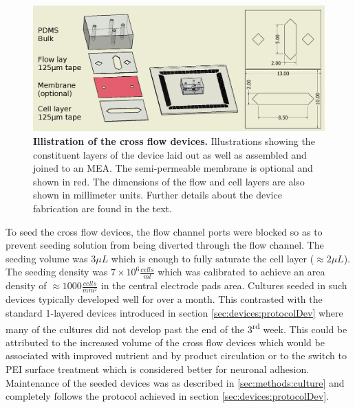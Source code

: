  \begin{figure}[h]
       \centering
       \includegraphics[width=15cm]{chapter5/figures/crossFlowIllustration/crossFlowIllustration.jpg}
       \caption[Illustration of the cross flow devices used for measuring culture activity under flow]{\textbf{Illistration of the cross flow devices.} Illustrations showing the constituent layers of the device laid out as well as assembled and joined to an MEA. The semi-permeable membrane is optional and shown in red. The dimensions of the flow and cell layers are also shown in millimeter units. Further details about the device fabrication are found in the text.}
       \label{fig:crossFlow:crossFlowIllustration}
  \end{figure}

To seed the cross flow devices, the flow channel ports were blocked so as to prevent seeding solution from being diverted through the flow channel. The seeding volume was \(3 \mu L\) which is enough to fully saturate the cell layer (\(\approx 2 \mu L\)). The seeding density was \(7\times 10^6\frac{cells}{ml}\) which was calibrated to achieve an area density of \(\approx 1000 \frac{cells}{mm^2}\) in the central electrode pads area. Cultures seeded in such devices typically developed well for over a month. This contrasted with the standard 1-layered devices introduced in section \ref{sec:devices:protocolDev} where many of the cultures did not develop past the end of the 3\textsuperscript{rd} week. This could be attributed to the increased volume of the cross flow devices which would be associated with improved nutrient and by product circulation or to the switch to PEI surface treatment which is considered better for neuronal adhesion. Maintenance of the seeded devices was as described in \ref{sec:methods:culture} and completely follows the protocol achieved in section \ref{sec:devices:protocolDev}.



